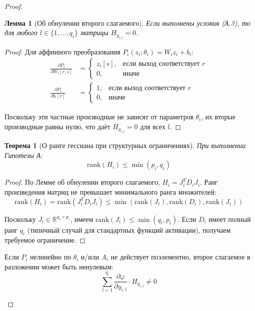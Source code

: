 \documentclass[a4paper,12pt]{article}
\newtheorem{theorem}{Теорема}
\newtheorem{lemma}{Лемма}
\begin{document}
\begin{proof}
    \begin{lemma}[Об обнулении второго слагаемого]
    Если выполнены условия (А.3), то для любого $l \in \{1,\ldots,q_i\}$ матрицы $H_{y_{i,l}} = 0$.
    \end{lemma}
    
    \begin{proof}
    Для аффинного преобразования $P_i(z_i; \theta_i) = W_i z_i + b_i$:
    \begin{align}
    \frac{\partial P_i}{\partial W_i[r,s]} &= \begin{cases} z_i[s], & \text{если выход соответствует } r \\ 0, & \text{иначе} \end{cases} \\
    \frac{\partial P_i}{\partial b_i[r]} &= \begin{cases} 1, & \text{если выход соответствует } r \\ 0, & \text{иначе} \end{cases}
    \end{align}
    
    Поскольку эти частные производные не зависят от параметров $\theta_i$, их вторые производные равны нулю, что даёт $H_{y_{i,l}} = 0$ для всех $l$.
    \end{proof}
    
    \begin{theorem}[О ранге гессиана при структурных ограничениях]
    При выполнении Гипотезы А:
    \begin{equation}
    \text{rank}(H_i) \leq \min(p_i, q_i)
    \end{equation}
    \end{theorem}
    
    \begin{proof}
    По Лемме об обнулении второго слагаемого, $H_i = J_i^T D_i J_i$. Ранг произведения матриц не превышает минимального ранга множителей:
    \begin{equation}
    \text{rank}(H_i) = \text{rank}(J_i^T D_i J_i) \leq \min(\text{rank}(J_i), \text{rank}(D_i), \text{rank}(J_i))
    \end{equation}
    
    Поскольку $J_i \in \mathbb{R}^{q_i \times p_i}$, имеем $\text{rank}(J_i) \leq \min(q_i, p_i)$. Если $D_i$ имеет полный ранг $q_i$ (типичный случай для стандартных функций активации), получаем требуемое ограничение.
    \end{proof}
    
    \begin{hypothesis}
    Если $P_i$ нелинейно по $\theta_i$ и/или $A_i$ не действует поэлементно, второе слагаемое в разложении может быть ненулевым:
    \begin{equation}
    \sum_{l=1}^{q_i} \frac{\partial \varphi}{\partial y_{i,l}} \cdot H_{y_{i,l}} \neq 0
    \end{equation}
    

\end{hypothesis}
\end{proof}
\end{document}
